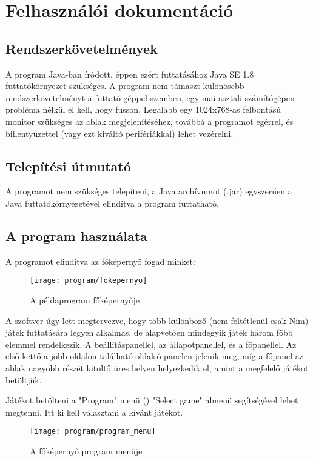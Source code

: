 
\section{Felhasználói dokumentáció}
\subsection{Rendszerkövetelmények}
A program Java-ban íródott, éppen ezért futtatásához Java SE 1.8 futtatókörnyezet szükséges. A program nem támaszt különösebb rendszerkövetelményt a futtató géppel szemben, egy mai asztali számítógépen probléma nélkül el kell, hogy fusson. Legalább egy 1024x768-as felbontású monitor szükséges az ablak megjelenítéséhez, továbbá a programot egérrel, és billentyűzettel (vagy ezt kiváltó perifériákkal) lehet vezérelni.

\subsection{Telepítési útmutató}
A programot nem szükséges telepíteni, a Java archívumot (.jar) egyszerűen a Java futtatókörnyezetével elindítva a program futtatható.

\subsection{A program használata}
A programot elindítva az  főképernyő fogad minket:\ujsor
\begin{figure}[ht]
	\texttt{[image: program/fokepernyo]}
	\centering
	\caption{A példaprogram főképernyője}
	\label{fig:fokepernyo}
\end{figure}

A szoftver úgy lett megtervezve, hogy több különböző (nem feltétlenül csak Nim) játék futtatására legyen alkalmas, de alapvetően mindegyik játék három főbb elemmel rendelkezik. A beállításpanellel, az állapotpanellel, és a főpanellel. Az első kettő a jobb oldalon található oldalsó panelen jelenik meg, míg a főpanel az ablak nagyobb részét kitöltő üres helyen helyezkedik el, amint a megfelelő játékot betöltjük. \ujsor

Játékot betölteni a "Program" menü () "Select game" almenü segítségével lehet megtenni. Itt ki kell választani a kívánt játékot. 
\begin{figure}[ht]
	\texttt{[image: program/program\_menu]}
	\centering
	\caption{A főképernyő program menüje}
	\label{fig:program_menu}
\end{figure}


